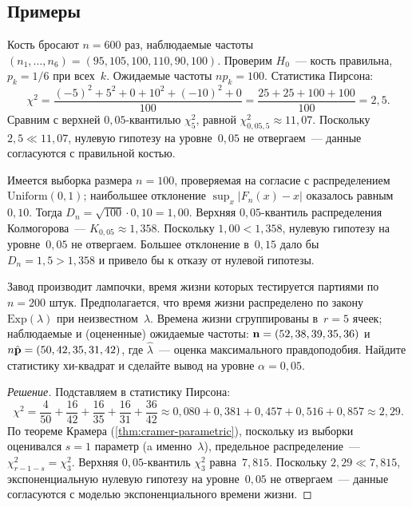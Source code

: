 \subsection*{Примеры}

\begin{example}
\label{ex:fair-die-test}
Кость бросают $n = 600$ раз, наблюдаемые частоты $(n_1, \dots, n_6) = (95, 105, 100, 110, 90, 100)$. Проверим $H_0$~--- кость правильна, $p_k = 1/6$ при всех~$k$. Ожидаемые частоты $n p_k = 100$. Статистика Пирсона:
\[
  \chi^2 = \frac{(-5)^2 + 5^2 + 0 + 10^2 + (-10)^2 + 0}{100} = \frac{25 + 25 + 100 + 100}{100} = 2{,}5.
\]
Сравним с верхней $0{,}05$-квантилью $\chi^2_5$, равной $\chi^2_{0{,}05, 5} \approx 11{,}07$. Поскольку $2{,}5 \ll 11{,}07$, нулевую гипотезу на уровне~$0{,}05$ не отвергаем~--- данные согласуются с правильной костью.
\end{example}

\begin{example}
\label{ex:ks-uniform}
Имеется выборка размера $n = 100$, проверяемая на согласие с распределением $\mathrm{Uniform}(0, 1)$; наибольшее отклонение $\sup_x |F_n(x) - x|$ оказалось равным~$0{,}10$. Тогда $D_n = \sqrt{100} \cdot 0{,}10 = 1{,}00$. Верхняя $0{,}05$-квантиль распределения Колмогорова~--- $K_{0{,}05} \approx 1{,}358$. Поскольку $1{,}00 < 1{,}358$, нулевую гипотезу на уровне~$0{,}05$ не отвергаем. Большее отклонение в~$0{,}15$ дало бы $D_n = 1{,}5 > 1{,}358$ и привело бы к отказу от нулевой гипотезы.
\end{example}

\begin{problem}
\label{prob:cramer-parametric-poisson}
Завод производит лампочки, время жизни которых тестируется партиями по~$n = 200$ штук. Предполагается, что время жизни распределено по закону $\mathrm{Exp}(\lambda)$ при неизвестном~$\lambda$. Времена жизни сгруппированы в~$r = 5$ ячеек; наблюдаемые и (оцененные) ожидаемые частоты:
$\mathbf{n} = (52, 38, 39, 35, 36)$ и $n \hat{\mathbf{p}} = (50, 42, 35, 31, 42)$, где $\hat \lambda$~--- оценка максимального правдоподобия. Найдите статистику хи-квадрат и сделайте вывод на уровне $\alpha = 0{,}05$.
\end{problem}

\begin{proof}[Решение]
Подставляем в статистику Пирсона:
\[
  \chi^2 = \frac{4}{50} + \frac{16}{42} + \frac{16}{35} + \frac{16}{31} + \frac{36}{42} \approx 0{,}080 + 0{,}381 + 0{,}457 + 0{,}516 + 0{,}857 \approx 2{,}29.
\]
По теореме Крамера (\cref{thm:cramer-parametric}), поскольку из выборки оценивался $s = 1$ параметр (a именно~$\lambda$), предельное распределение~--- $\chi^2_{r - 1 - s} = \chi^2_3$. Верхняя $0{,}05$-квантиль $\chi^2_3$ равна~$7{,}815$. Поскольку $2{,}29 \ll 7{,}815$, экспоненциальную нулевую гипотезу на уровне~$0{,}05$ не отвергаем~--- данные согласуются с моделью экспоненциального времени жизни.
\end{proof}
